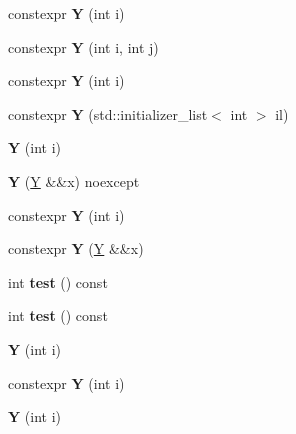 \begin{DoxyCompactItemize}
\item 
\mbox{\label{struct_y_a2e9959d9603081746897b7a2f6904f93}} 
constexpr {\bfseries Y} (int i)
\item 
\mbox{\label{struct_y_a99fe2a6a01f13f53227da46f162f20ee}} 
constexpr {\bfseries Y} (int i, int j)
\item 
\mbox{\label{struct_y_a2e9959d9603081746897b7a2f6904f93}} 
constexpr {\bfseries Y} (int i)
\item 
\mbox{\label{struct_y_a407a014e87f62dd251ba1f4eeed90b7b}} 
constexpr {\bfseries Y} (std\+::initializer\+\_\+list$<$ int $>$ il)
\item 
\mbox{\label{struct_y_af1588259bfcb402645136c0b58e2f133}} 
{\bfseries Y} (int i)
\item 
\mbox{\label{struct_y_a96ef8bac1c7f3261374f3b6d24491402}} 
{\bfseries Y} (\mbox{\hyperlink{struct_y}{Y}} \&\&x) noexcept
\item 
\mbox{\label{struct_y_a2e9959d9603081746897b7a2f6904f93}} 
constexpr {\bfseries Y} (int i)
\item 
\mbox{\label{struct_y_a86d4b4a729df35e7e1e5ac339880b3fe}} 
constexpr {\bfseries Y} (\mbox{\hyperlink{struct_y}{Y}} \&\&x)
\item 
\mbox{\label{struct_y_adcee51e05c013f60924afc043bc64116}} 
int {\bfseries test} () const
\item 
\mbox{\label{struct_y_adcee51e05c013f60924afc043bc64116}} 
int {\bfseries test} () const
\item 
\mbox{\label{struct_y_af1588259bfcb402645136c0b58e2f133}} 
{\bfseries Y} (int i)
\item 
\mbox{\label{struct_y_a2e9959d9603081746897b7a2f6904f93}} 
constexpr {\bfseries Y} (int i)
\item 
\mbox{\label{struct_y_af1588259bfcb402645136c0b58e2f133}} 
{\bfseries Y} (int i)
\item 

\end{DoxyCompactItemize}

